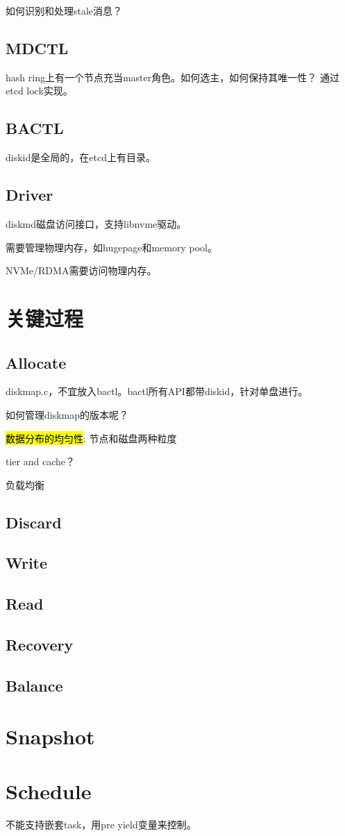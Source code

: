 如何识别和处理stale消息？

\subsection{MDCTL}

hash ring上有一个节点充当master角色。如何选主，如何保持其唯一性？
通过etcd lock实现。

\subsection{BACTL}

diskid是全局的，在etcd上有目录。

\subsection{Driver}

diskmd磁盘访问接口，支持libnvme驱动。

需要管理物理内存，如hugepage和memory pool。

NVMe/RDMA需要访问物理内存。

\section{关键过程}

\subsection{Allocate}

diskmap.c，不宜放入bactl。bactl所有API都带diskid，针对单盘进行。

如何管理diskmap的版本呢？

\hl{数据分布的均匀性}: 节点和磁盘两种粒度

tier and cache？

负载均衡

\subsection{Discard}

\subsection{Write}

\subsection{Read}

\subsection{Recovery}

\subsection{Balance}

\section{Snapshot}

\section{Schedule}

不能支持嵌套task，用pre yield变量来控制。

